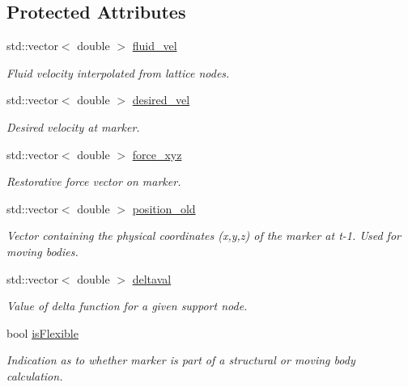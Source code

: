 \subsection*{Protected Attributes}
\begin{DoxyCompactItemize}
\item 
std\+::vector$<$ double $>$ \hyperlink{class_i_b_marker_aa31ccf45de61bfccc60876ac9e98909a}{fluid\+\_\+vel}
\begin{DoxyCompactList}\small\item\em Fluid velocity interpolated from lattice nodes. \end{DoxyCompactList}\item 
std\+::vector$<$ double $>$ \hyperlink{class_i_b_marker_ad9535b494684533ace9a9523c4df26bf}{desired\+\_\+vel}
\begin{DoxyCompactList}\small\item\em Desired velocity at marker. \end{DoxyCompactList}\item 
std\+::vector$<$ double $>$ \hyperlink{class_i_b_marker_aa8b8b23e64a8bfc4051b95ebf9ccb767}{force\+\_\+xyz}
\begin{DoxyCompactList}\small\item\em Restorative force vector on marker. \end{DoxyCompactList}\item 
std\+::vector$<$ double $>$ \hyperlink{class_i_b_marker_a6a55fe2293f288ae339036ea4a3bc7df}{position\+\_\+old}
\begin{DoxyCompactList}\small\item\em Vector containing the physical coordinates (x,y,z) of the marker at t-\/1. Used for moving bodies. \end{DoxyCompactList}\item 
std\+::vector$<$ double $>$ \hyperlink{class_i_b_marker_a82296e15048c55bd121245d85b076168}{deltaval}
\begin{DoxyCompactList}\small\item\em Value of delta function for a given support node. \end{DoxyCompactList}\item 
bool \hyperlink{class_i_b_marker_a190d90424dc97a7d83669f81dd8273a8}{is\+Flexible}
\begin{DoxyCompactList}\small\item\em Indication as to whether marker is part of a structural or moving body calculation. \end{DoxyCompactList}\item 

\end{DoxyCompactItemize}
